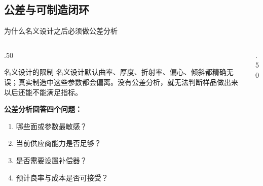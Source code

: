 \subsection{公差与可制造闭环}
\label{sec:2.3}

\begin{frame}{为什么名义设计之后必须做公差分析}\label{2.8}
    \begin{columns}[T]
        \begin{column}{.50\textwidth}
            \begin{block}{名义设计的限制}
                名义设计默认曲率、厚度、折射率、偏心、倾斜都精确无误；真实制造中这些参数都会偏离。没有公差分析，就无法判断样品做出来以后还能不能满足指标。
            \end{block}

            \textbf{公差分析回答四个问题：}
            \begin{enumerate}
                \item 哪些面或参数最敏感？
                \item 当前供应商能力是否足够？
                \item 是否需要设置补偿器？
                \item 预计良率与成本是否可接受？
            \end{enumerate}
        \end{column}
        \hfill
        \begin{column}{.50\textwidth}
            \scriptsize
            \begin{table}
                \centering
                \renewcommand{\arraystretch}{1.28}
                \caption{Tolerance Data Editor 中的常见公差项}
                \label{tab:tolerance_operands_main}
            \end{table}
        \end{column}
    \end{columns}
\end{frame}

